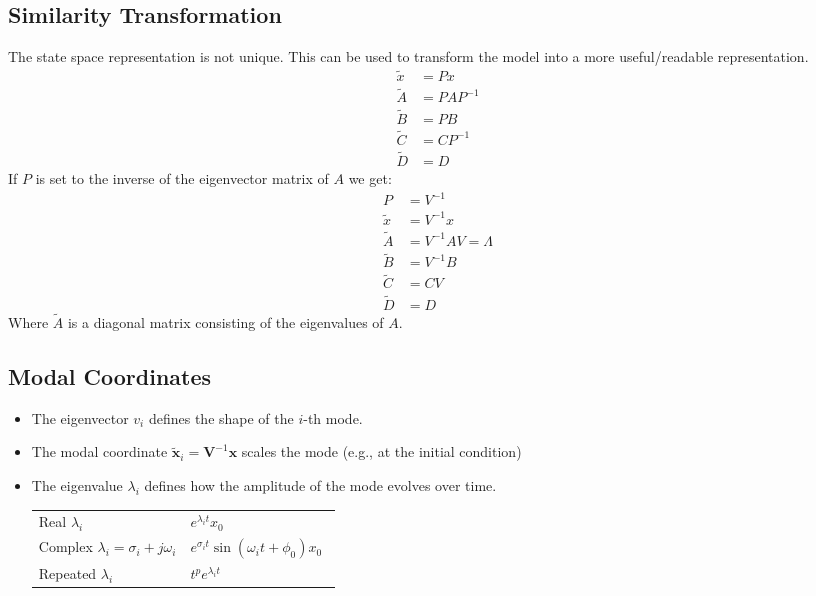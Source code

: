 \subsection{Similarity Transformation}
The state space representation is not unique. This can be used to transform the model into a more \flqq{}useful/readable\frqq{} representation.
\begin{align*}
    \tilde{x} & = Px       \\
    \tilde{A} & = PAP^{-1} \\
    \tilde{B} & = PB       \\
    \tilde{C} & = CP^{-1}  \\
    \tilde{D} & = D
\end{align*}
If $P$ is set to the inverse of the eigenvector matrix of $A$ we get:
\begin{align*}
    P         & = V^{-1}             \\
    \tilde{x} & = V^{-1}x            \\
    \tilde{A} & = V^{-1}AV = \Lambda \\
    \tilde{B} & = V^{-1}B            \\
    \tilde{C} & = CV                 \\
    \tilde{D} & = D
\end{align*}
Where $\tilde{A}$ is a diagonal matrix consisting of the eigenvalues of $A$.

\subsection{Modal Coordinates}
\begin{itemize}
    \item The eigenvector $v_i$ defines the shape of the $i$-th mode.
    \item The modal coordinate $\tilde{\mathbf{x}}_i=\mathbf{V}^{-1}\mathbf{x}$ scales the mode (e.g., at the initial condition)
    \item The eigenvalue $\lambda_i$ defines how the amplitude of the mode evolves over time.
          
          \begin{tabularx}{\linewidth}{@{}p{0.5\linewidth}X@{}}
              \quad Real $\lambda_i$                            & \textrightarrow{} $e^{\lambda_i t}x_0$                         \\
              \quad Complex $\lambda_i = \sigma_i + j \omega_i$ & \textrightarrow{} $e^{\sigma_i t}\sin(\omega_i t + \phi_0)x_0$ \\
              \quad Repeated $\lambda_i$                        & \textrightarrow{} $t^p e^{\lambda_i t}$

              
          \end{tabularx}
\end{itemize}

